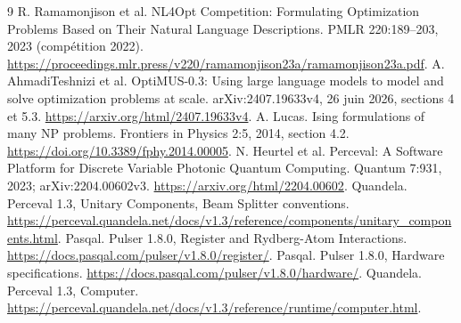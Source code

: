 \documentclass{article}
\begin{document}
\begin{thebibliography}{9}
 R. Ramamonjison et al.
NL4Opt Competition: Formulating Optimization Problems Based on Their
Natural Language Descriptions. PMLR 220:189--203, 2023 (compétition 2022).
\url{https://proceedings.mlr.press/v220/ramamonjison23a/ramamonjison23a.pdf}.
 A. AhmadiTeshnizi et al.
OptiMUS-0.3: Using large language models to model and solve optimization
problems at scale. arXiv:2407.19633v4, 26 juin 2026, sections 4 et 5.3.
\url{https://arxiv.org/html/2407.19633v4}.
 A. Lucas. Ising formulations of many NP problems.
Frontiers in Physics 2:5, 2014, section 4.2.
\url{https://doi.org/10.3389/fphy.2014.00005}.
 N. Heurtel et al.
Perceval: A Software Platform for Discrete Variable Photonic Quantum
Computing. Quantum 7:931, 2023; arXiv:2204.00602v3.
\url{https://arxiv.org/html/2204.00602}.
 Quandela. Perceval 1.3, Unitary Components,
Beam Splitter conventions.
\url{https://perceval.quandela.net/docs/v1.3/reference/components/unitary_components.html}.
 Pasqal. Pulser 1.8.0, Register and Rydberg-Atom Interactions.
\url{https://docs.pasqal.com/pulser/v1.8.0/register/}.
 Pasqal. Pulser 1.8.0, Hardware specifications.
\url{https://docs.pasqal.com/pulser/v1.8.0/hardware/}.
 Quandela. Perceval 1.3, Computer.
\url{https://perceval.quandela.net/docs/v1.3/reference/runtime/computer.html}.
\end{thebibliography}
\end{document}
